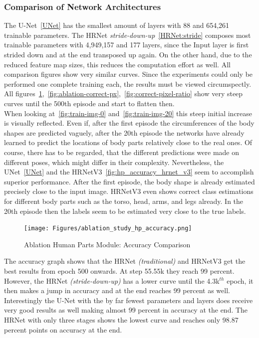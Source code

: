 \subsubsection{Comparison of Network Architectures}
%
The U-Net~\ref{UNet} has the smallest amount of layers with 88 and 654,261 trainable parameters.
The HRNet \textit{stride-down-up}~\ref{HRNet:stride} composes most trainable parameters with 4,949,157 and 177
layers, since the Input
layer is first strided down and at the end transposed up again.
On the other hand, due to the reduced feature map sizes, this reduces the computation effort as well.
All comparison figures show very similar curves.
Since the experiments could only be performed one complete training each, the results must be viewed circumspectly.
All figures~\ref{fig:ablation-accuracy},~\ref{fig:ablation-correct-px},~\ref{fig:correct-pixel-ratio} show very steep
curves until
the 500th episode and start to flatten then.\\
When looking at~\ref{fig:train-img-0} and~\ref{fig:train-img-20} this steep initial increase is visually reflected.
Even if, after the first episode the circumferences of the body shapes are predicted vaguely, after the 20th episode the
networks have already learned to predict the locations of body parts relatively close to the real ones.
Of course, there has to be regarded, that the different predictions were made on different poses, which might differ in
their complexity.
Nevertheless, the UNet~\ref{UNet} and the HRNetV3~\ref{fig:hp_accuracy_hrnet_v3} seem to accomplish superior
performance.
After the first episode, the body shape is already estimated precisely close to the input image.
HRNetV3 even shows correct class estimations for different body parts such as the torso, head, arms, and legs already.
In the 20th episode then the labels seem to be estimated very close to the true labels.

\begin{figure}[H]
    \centering
    \texttt{[image: Figures/ablation\_study\_hp\_accuracy.png]}
    \decoRule
    \caption[Ablation Human Parts Module: Accuracy]{Ablation Human Parts Module: Accuracy Comparison}
    \label{fig:ablation-accuracy}
\end{figure}

The accuracy graph shows that the HRNet \textit{(traditional)} and HRNetV3 get the best results from epoch 500 onwards.
At step 55.55k they reach 99 percent.
However, the HRNet \textit{(stride-down-up)} has a lower curve until the 4.3k$^{th}$ epoch, it then makes a jump in accuracy
and at the end reaches 99 percent as well.
Interestingly the U-Net with the by far fewest parameters and layers does receive very good results as well making almost
99 percent in accuracy at the end.
The HRNet with only three stages shows the lowest curve and reaches only 98.87 percent points on accuracy at the end.

